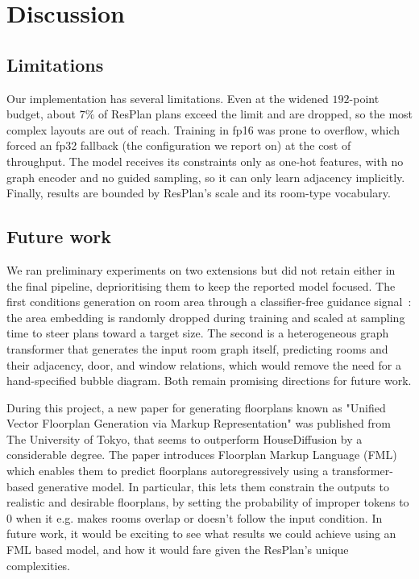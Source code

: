 \section{Discussion}

\subsection{Limitations}
Our implementation has several limitations. Even at the widened $192$-point budget,
about $7\%$ of ResPlan plans exceed the limit and are dropped, so the most complex
layouts are out of reach. Training in fp16 was prone to overflow, which forced an
fp32 fallback (the configuration we report on) at the cost of throughput. The model
receives its constraints only as one-hot features, with no graph encoder and no
guided sampling, so it can only learn adjacency implicitly. Finally, results are
bounded by ResPlan's scale and its room-type vocabulary.

\subsection{Future work}
We ran preliminary experiments on two extensions but did not retain either in the
final pipeline, deprioritising them to keep the reported model focused. The first
conditions generation on room area through a classifier-free guidance
signal~\cite{classifierfree}: the area embedding is randomly dropped during
training and scaled at sampling time to steer plans toward a target size. The
second is a heterogeneous graph transformer that generates the input room graph
itself, predicting rooms and their adjacency, door, and window relations, which
would remove the need for a hand-specified bubble diagram. Both remain promising
directions for future work.

During this project, a new paper for generating floorplans known as "Unified Vector Floorplan Generation via Markup Representation" \cite{FML} was published from The University of Tokyo, that seems to outperform HouseDiffusion by a considerable degree. The paper introduces Floorplan Markup Language (FML) which enables them to predict floorplans autoregressively using a transformer-based generative model. In particular, this lets them constrain the outputs to realistic and desirable floorplans, by setting the probability of improper tokens to 0 when it e.g. makes rooms overlap or doesn't follow the input condition. In future work, it would be exciting to see what results we could achieve using an FML based model, and how it would fare given the ResPlan's unique complexities.

